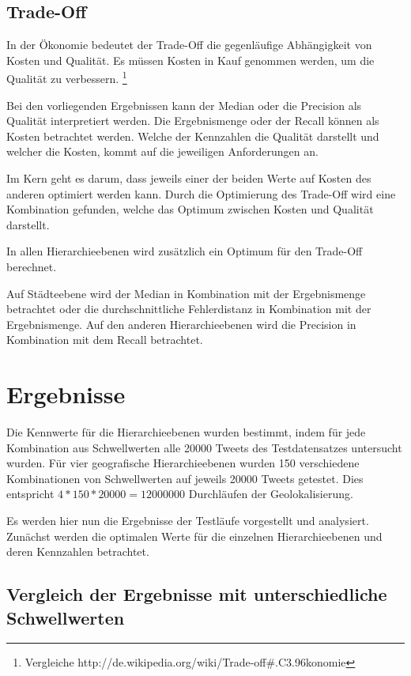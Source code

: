 		\subsection{Trade-Off}

			In der Ökonomie bedeutet der Trade-Off die gegenläufige Abhängigkeit von Kosten und Qualität.
			Es müssen Kosten in Kauf genommen werden, um die Qualität zu verbessern. \footnote{Vergleiche http://de.wikipedia.org/wiki/Trade-off\#.C3.96konomie} 
			
			Bei den vorliegenden Ergebnissen kann der Median oder die Precision als Qualität interpretiert werden.
			Die Ergebnismenge oder der Recall können als Kosten betrachtet werden.
			Welche der Kennzahlen die Qualität darstellt und welcher die Kosten, kommt auf die jeweiligen Anforderungen an. 

			Im Kern geht es darum, dass jeweils einer der beiden Werte auf Kosten des anderen optimiert werden kann.
			Durch die Optimierung des Trade-Off wird eine Kombination gefunden, welche das Optimum zwischen Kosten und Qualität darstellt.

			In allen Hierarchieebenen wird zusätzlich ein Optimum für den Trade-Off berechnet. 

			Auf Städteebene wird der Median in Kombination mit der Ergebnismenge betrachtet oder die durchschnittliche Fehlerdistanz in Kombination mit der Ergebnismenge.
			Auf den anderen Hierarchieebenen wird die Precision in Kombination mit dem Recall betrachtet.

	\section{Ergebnisse}

		Die Kennwerte für die Hierarchieebenen wurden bestimmt, indem für jede Kombination aus Schwellwerten alle 20000 Tweets des Testdatensatzes untersucht wurden.
		Für vier geografische Hierarchieebenen wurden 150 verschiedene Kombinationen von Schwellwerten auf jeweils 20000 Tweets getestet.
		Dies entspricht $4*150*20000 = 12000000$ Durchläufen der Geolokalisierung.

		Es werden hier nun die Ergebnisse der Testläufe vorgestellt und analysiert.
		Zunächst werden die optimalen Werte für die einzelnen Hierarchieebenen und deren Kennzahlen betrachtet.


		\subsection{Vergleich der Ergebnisse mit unterschiedliche Schwellwerten} 

